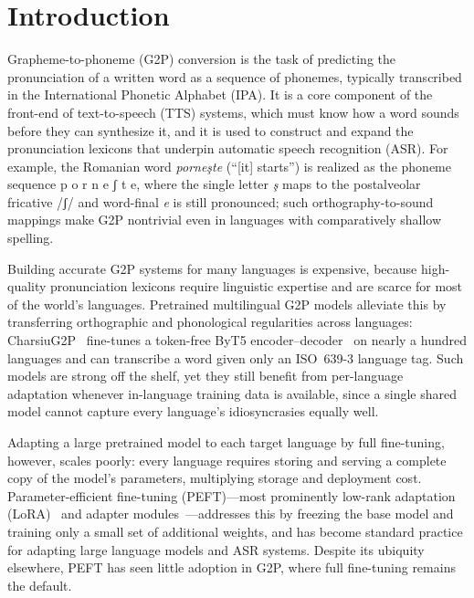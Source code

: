 \documentclass[conference]{IEEEtran}
\newcommand{\ipa}[1]{{\ipafont #1}}
\begin{document}
\section{Introduction}\label{sec:intro}

Grapheme-to-phoneme (G2P) conversion is the task of predicting the pronunciation of a written word as a sequence of phonemes, typically transcribed in the International Phonetic Alphabet (IPA). It is a core component of the front-end of text-to-speech (TTS) systems, which must know how a word sounds before they can synthesize it, and it is used to construct and expand the pronunciation lexicons that underpin automatic speech recognition (ASR). For example, the Romanian word \emph{porne\c{s}te} (``[it] starts'') is realized as the phoneme sequence \ipa{p o r n e ʃ t e}, where the single letter \emph{\c{s}} maps to the postalveolar fricative \ipa{/ʃ/} and word-final \emph{e} is still pronounced; such orthography-to-sound mappings make G2P nontrivial even in languages with comparatively shallow spelling.

Building accurate G2P systems for many languages is expensive, because high-quality pronunciation lexicons require linguistic expertise and are scarce for most of the world's languages. Pretrained multilingual G2P models alleviate this by transferring orthographic and phonological regularities across languages: CharsiuG2P~\cite{zhu2022} fine-tunes a token-free ByT5 encoder--decoder~\cite{xue2022byt5} on nearly a hundred languages and can transcribe a word given only an ISO~639-3 language tag. Such models are strong off the shelf, yet they still benefit from per-language adaptation whenever in-language training data is available, since a single shared model cannot capture every language's idiosyncrasies equally well.

Adapting a large pretrained model to each target language by full fine-tuning, however, scales poorly: every language requires storing and serving a complete copy of the model's parameters, multiplying storage and deployment cost. Parameter-efficient fine-tuning (PEFT)---most prominently low-rank adaptation (LoRA)~\cite{hu2021} and adapter modules~\cite{houlsby2019}---addresses this by freezing the base model and training only a small set of additional weights, and has become standard practice for adapting large language models and ASR systems. Despite its ubiquity elsewhere, PEFT has seen little adoption in G2P, where full fine-tuning remains the default.
\end{document}
